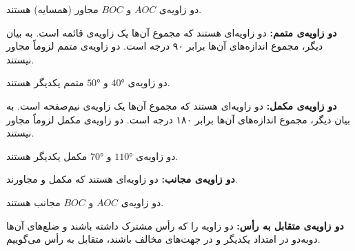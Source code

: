 \begin{example}
	دو زاویه‌ی $AOC$ و $BOC$ مجاور (همسایه) هستند.
	\begin{center}
	\end{center}
\end{example}
\smallskip
\textbf{دو زاویه‌ی متمم:}
دو زاویه‌ای هستند که مجموع آن‌ها یک زاویه‌ی قائمه است. به بیان دیگر، مجموع اندازه‌های آن‌ها برابر ۹۰ درجه است. دو زاویه‌ی متمم لزوماً مجاور نیستند.
\begin{example}
	دو زاویه‌ی
	$\ang{40}$ و $\ang{50}$
	متمم یکدیگر هستند.
\end{example}
\smallskip
\textbf{دو زاویه‌ی مکمل:}
دو زاویه‌ای هستند که مجموع آن‌ها یک زاویه‌ی نیم‌صفحه است. به بیان دیگر، مجموع اندازه‌های آن‌ها برابر ۱۸۰ درجه است. دو زاویه‌ی مکمل لزوماً مجاور نیستند.
\begin{example}
	دو زاویه‌ی
	$\ang{110}$ و $\ang{70}$
	مکمل یکدیگر هستند.
\end{example}
\smallskip
\textbf{دو زاویه‌ی مجانب:}
دو زاویه‌ای هستند که مکمل و مجاورند.
\begin{example}
	دو زاویه‌ی $AOC$ و $BOC$ مجانب هستند.
	\begin{center}
	\end{center}
\end{example}
\smallskip
\textbf{دو زاویه‌ی متقابل به رأس:}
دو زاویه را که رأس مشترک داشته باشند و ضلع‌های آن‌ها دوبه‌دو در امتداد یکدیگر و در جهت‌های مخالف باشند، متقابل به رأس می‌گوییم.
